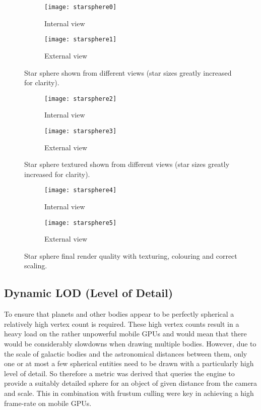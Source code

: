 \begin{figure}[!htbp]
\centering
\begin{subfigure}{.5\textwidth}
  \centering
  \texttt{[image: starsphere0]}
  \caption{Internal view}
  \label{fig:starsphereint0}
\end{subfigure}%
\begin{subfigure}{.5\textwidth}
  \centering
  \texttt{[image: starsphere1]}
  \caption{External view}
  \label{fig:starsphereext0}
\end{subfigure}
\caption{Star sphere shown from different views (star sizes greatly increased for clarity).}
\label{fig:stars1}
\end{figure}

\begin{figure}[!htbp]
\centering
\begin{subfigure}{.5\textwidth}
  \centering
  \texttt{[image: starsphere2]}
  \caption{Internal view}
  \label{fig:starsphereint1}
\end{subfigure}%
\begin{subfigure}{.5\textwidth}
  \centering
  \texttt{[image: starsphere3]}
  \caption{External view}
  \label{fig:starsphereext1}
\end{subfigure}
\caption{Star sphere textured shown from different views (star sizes greatly increased for clarity).}
\label{fig:stars2}
\end{figure}

\begin{figure}[!htbp]
\centering
\begin{subfigure}{.5\textwidth}
  \centering
  \texttt{[image: starsphere4]}
  \caption{Internal view}
  \label{fig:starsphereint2}
\end{subfigure}%
\begin{subfigure}{.5\textwidth}
  \centering
  \texttt{[image: starsphere5]}
  \caption{External view}
  \label{fig:starsphereext2}
\end{subfigure}
\caption{Star sphere final render quality with texturing, colouring and correct scaling.}
\label{fig:stars3}
\end{figure}

\subsection{Dynamic LOD (Level of Detail)}

To ensure that planets and other bodies appear to be perfectly spherical a relatively high vertex count is required. These high vertex counts result in a heavy load on the rather unpowerful mobile GPUs and would mean that there would be considerably slowdowns when drawing multiple bodies. However, due to the scale of galactic bodies and the astronomical distances between them, only one or at most a few spherical entities need to be drawn with a particularly high level of detail. So therefore a metric was derived that queries the engine to provide a suitably detailed sphere for an object of given distance from the camera and scale. This in combination with frustum culling were key in achieving a high frame-rate on mobile GPUs.

